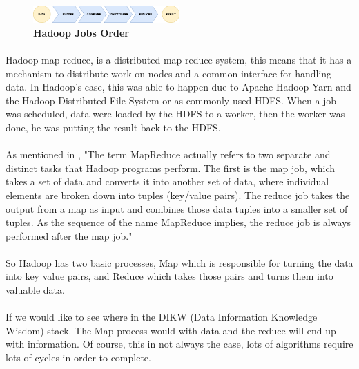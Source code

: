 \begin{figure}[h]
	\centering
	\includegraphics[width=0.5\textwidth]{images/HadoopMapReduceProcesses.png}
	\caption{\bfseries Hadoop Jobs Order}
	\label{hadoopJobsOrder}
\end{figure}

\paragraph{}Hadoop map reduce, is a distributed map-reduce system, 
this means that it has a mechanism to distribute work on nodes and a common interface for handling data. In Hadoop's case, this was able to happen due to Apache Hadoop Yarn and the Hadoop Distributed File System or as commonly used HDFS. When a job was scheduled, data were loaded by the HDFS to a worker, 
then the worker was done, he was putting the result back to the HDFS. 

\paragraph{}As mentioned in \cite{ibmMapReduce:5}, "The term MapReduce actually refers to two separate and distinct tasks that Hadoop programs perform. The first is the map job, which takes a set of data and converts it into another set of data, where individual elements are broken down into tuples (key/value pairs). The reduce job takes the output from a map as input and combines those data tuples into a smaller set of tuples. As the sequence of the name MapReduce implies, the reduce job is always performed after the map job."

\paragraph{}So Hadoop has two basic processes, Map which is responsible for turning the data into key value pairs, and Reduce which takes those pairs and turns them into valuable data.

\paragraph{}If we would like to see where in the DIKW (Data Information Knowledge Wisdom) stack. The Map process would with data and the reduce will end up with information. Of course, this in not always the case, lots of algorithms require lots of cycles in order to complete.
 
